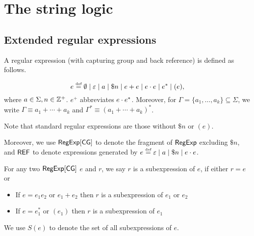 \section{The string logic}

\subsection{Extended regular expressions}

A regular expression (with capturing group and back reference) is defined as follows.

\begin{definition}
	\[e \eqdef \emptyset \mid \varepsilon \mid a \mid \$n \mid e + e \mid e \concat e \mid e^* \mid (e)  , \]
	where $a \in \Sigma, n \in \mathbb{Z}^+$. 
	$e^+$ abbreviates $e \cdot e^*$. Moreover, for $\Gamma = \{a_1, \ldots, a_k\}\subseteq \Sigma$, we write $\Gamma \equiv a_1 + \cdots + a_k$ and $\Gamma^\ast \equiv (a_1 + \cdots + a_k)^\ast$. 
\end{definition}

Note that standard regular expressions are those without $\$ n$ or $(e)$.
%

Moreover, we use ${\sf RegExp}[\sf CG]$ to denote the fragment of ${\sf RegExp}$  excluding $\$ n$, and ${\sf REF}$ to denote expressions generated by $e \eqdef \varepsilon \mid a \mid \$n \mid e \concat e$.





\begin{definition}[Subexpression]
	For any two ${\sf RegExp}[\sf CG]$ $e$ and $r$, we say $r$ is a subexpression of $e$,
	if either $r=e$ or
	\begin{itemize}
		\item If $e = e_1 e_2$ or $e_1 + e_2$ then $r$ is a subexpression of $e_1$
		or $e_2$
		
		\item If $e = e_1^{\ast}$ or $(e_1)$ then $r$ is a subexpression of $e_1$
	\end{itemize}
	We use $S (e)$ to denote the set of all subexpressions of $e$.
\end{definition}


